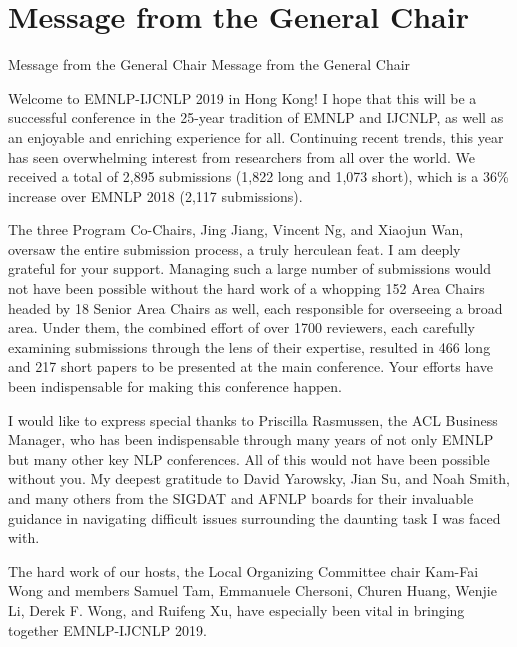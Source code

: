 \section{Message from the General Chair}\vspace{2em}
\setheaders%
    {Message from the General Chair}%
    {Message from the General Chair}
\thispagestyle{emptyheader}

\setlength{\parskip}{1ex}

Welcome to EMNLP-IJCNLP 2019 in Hong Kong! I hope that this will be a successful conference in the 25-year tradition of EMNLP and IJCNLP, as well as an enjoyable and enriching experience for all. Continuing recent trends, this year has seen overwhelming interest from researchers from all over the world. We received a total of 2,895 submissions (1,822 long and 1,073 short), which is a 36\% increase over EMNLP 2018 (2,117 submissions).

The three Program Co-Chairs, Jing Jiang, Vincent Ng, and Xiaojun Wan, oversaw the entire submission process, a truly herculean feat. I am deeply grateful for your support. Managing such a large number of submissions would not have been possible without the hard work of a whopping 152 Area Chairs headed by 18 Senior Area Chairs as well, each responsible for overseeing a broad area. Under them, the combined effort of over 1700 reviewers, each carefully examining submissions through the lens of their expertise, resulted in 466 long and 217 short papers to be presented at the main conference. Your efforts have been indispensable for making this conference happen. 
 
I would like to express special thanks to Priscilla Rasmussen, the ACL Business Manager, who has been indispensable through many years of not only EMNLP but many other key NLP conferences. All of this would not have been possible without you. My deepest gratitude to David Yarowsky, Jian Su, and Noah Smith, and many others from the SIGDAT and AFNLP boards for their invaluable guidance in navigating difficult issues surrounding the daunting task I was faced with. 
 
The hard work of our hosts, the Local Organizing Committee chair Kam-Fai Wong and members Samuel Tam, Emmanuele Chersoni, Churen Huang, Wenjie Li, Derek F. Wong, and Ruifeng Xu, have especially been vital in bringing together EMNLP-IJCNLP 2019.

